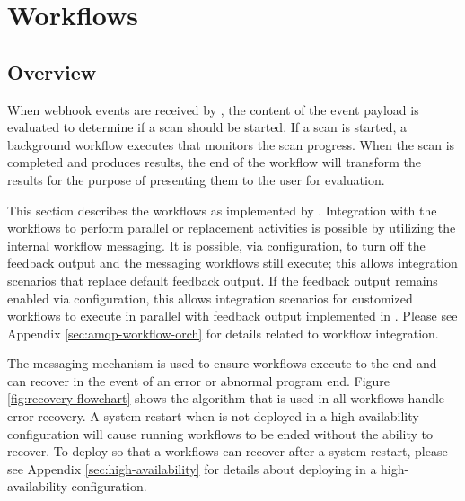 \chapter{Workflows}\label{sec:workflows}


\section{Overview}

When webhook events are received by \cxoneflow, the content of the event
payload is evaluated to determine if a scan should be started.  If a scan
is started, a background workflow executes that monitors the scan progress.
When the scan is completed and produces results, the end of the workflow
will transform the results for the purpose of presenting them to the user
for evaluation.

This section describes the workflows as implemented by \cxoneflow.  Integration
with the workflows to perform parallel or replacement activities is possible
by utilizing the internal workflow messaging. It is possible, via configuration,
to turn off the feedback output and the messaging workflows still execute; this
allows integration scenarios that replace default feedback output.  If the
feedback output remains enabled via configuration, this allows integration
scenarios for customized workflows to execute in parallel with feedback
output implemented in \cxoneflow. Please see Appendix 
\ref{sec:amqp-workflow-orch} for details related to workflow integration.

The messaging mechanism is used to ensure workflows execute to the end
and can recover in the event of an error or abnormal program end.  Figure
\ref{fig:recovery-flowchart} shows the algorithm that is used
in all workflows handle error recovery.  A system restart when \cxoneflow
is not deployed in a high-availability configuration will cause running workflows
to be ended without the ability to recover.  To deploy \cxoneflow so that
a workflows can recover after a system restart, please see
Appendix \ref{sec:high-availability} for details about deploying \cxoneflow
in a high-availability configuration.


